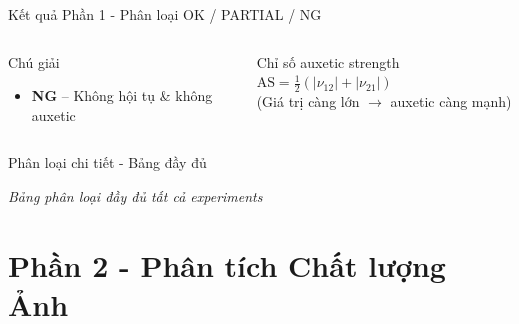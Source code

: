 \documentclass[aspectratio=169,11pt]{beamer}
\newcommand{\tabdir}{outputs/tables}
\begin{document}
\begin{frame}{Kết quả Phần 1 - Phân loại OK / PARTIAL / NG}
\begin{columns}[T, onlytextwidth]
\begin{block}{Chú giải}
\begin{itemize}
          \item \textcolor{ngred}{\textbf{NG}} -- Không hội tụ \&
                không auxetic
        \end{itemize}
      \end{block}
      \vspace{0.2cm}
      \begin{block}{Chỉ số auxetic strength}
        \small
        $\text{AS} = \tfrac{1}{2}(|\nu_{12}|+|\nu_{21}|)$\\
        (Giá trị càng lớn $\to$ auxetic càng mạnh)
      \end{block}
  \end{columns}
\end{frame}

\begin{frame}{Phân loại chi tiết - Bảng đầy đủ}
  \begin{center}
    \footnotesize
    
  \end{center}
  {\footnotesize\textit{Bảng phân loại đầy đủ tất cả experiments}}
\end{frame}

\section{Phần 2 - Phân tích Chất lượng Ảnh}
\end{document}
